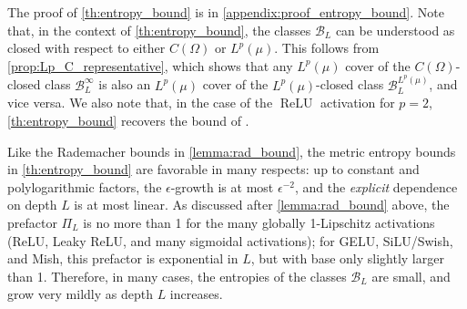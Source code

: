 \documentclass{article}
\DeclareMathOperator{\ReLU}{\mathrm{ReLU}}
\def\cB{{\mathcal{B}}}
\begin{document}
The proof of \cref{th:entropy_bound} is in \cref{appendix:proof_entropy_bound}. Note that, in the context of \cref{th:entropy_bound}, the classes $\cB_L$ can be understood as closed with respect to either $C(\Omega)$ or $L^p(\mu)$. This follows from \cref{prop:Lp_C_representative}, which shows that any $L^p(\mu)$ cover of the $C(\Omega)$-closed class $\cB_L^\infty$ is also an $L^p(\mu)$ cover of the $L^p(\mu)$-closed class $\cB_L^{L^p(\mu)}$, and vice versa. We also note that, in the case of the $\ReLU$ activation for $p=2$, \cref{th:entropy_bound} recovers the bound of \cite{barron2019complexity}.

Like the Rademacher bounds in \cref{lemma:rad_bound}, the metric entropy bounds in \cref{th:entropy_bound} are favorable in many respects: up to constant and polylogarithmic factors, the $\epsilon$-growth is at most $\epsilon^{-2}$, and the \textit{explicit} dependence on depth $L$ is at most linear. As discussed after \cref{lemma:rad_bound} above, the prefactor $\Pi_L$ is no more than 1 for the many globally 1-Lipschitz activations (ReLU, Leaky ReLU, and many sigmoidal activations);  for GELU, SiLU/Swish, and Mish, this prefactor is exponential in $L$, but with base only slightly larger than 1. Therefore, in many cases, the entropies of the classes $\cB_L$ are small, and grow very mildly as depth $L$ increases.
\end{document}
